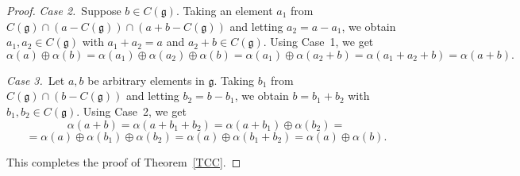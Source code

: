\documentclass[10pt,a4paper]{amsart}
\def\ggg{\mathfrak{g}}
\begin{document}
\begin{proof}
\bigskip

{\it Case 2.}\ Suppose $b\in C(\mathfrak{g})$. Taking an element $a_1$ from $C(\mathfrak{g})\cap(a-C(\mathfrak{g}))\cap(a+b-C(\mathfrak{g}))$
and letting $a_2=a-a_1$, we obtain $a_1, a_2\in C(\mathfrak{g})$ with $a_1+a_2=a$ and $a_2+b\in C(\mathfrak{g})$. Using Case~1, we get
$$
\alpha(a)\oplus\alpha(b)=\alpha(a_1)\oplus\alpha(a_2)\oplus\alpha(b)=\alpha(a_1)\oplus\alpha(a_2+b)=\alpha(a_1+a_2+b)=\alpha(a+b).
$$

\bigskip

{\it Case 3.}\  Let $a,b$ be arbitrary elements in $\ggg$. Taking $b_1$ from $C(\ggg)\cap(b-C(\ggg))$ and letting $b_2=b-b_1$, we obtain
$b=b_1+b_2$ with $b_1,b_2\in C(\mathfrak{g})$. Using Case~2, we get
$$
\alpha(a+b)=\alpha(a+b_1+b_2)=\alpha(a+b_1)\oplus\alpha(b_2)=
$$
$$
=\alpha(a)\oplus\alpha(b_1)\oplus\alpha(b_2)=\alpha(a)\oplus\alpha(b_1+b_2)=\alpha(a)\oplus\alpha(b).
$$
\smallskip

This completes the proof of Theorem~\ref{TCC}.
\end{proof} 
\end{document}

